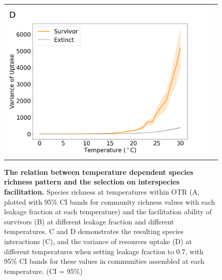 \begin{figure}
\begin{tabular}{c@{}c@{}}
    \includegraphics[scale=0.27]{./Figures/07_U.png}
    \end{tabular}
    \caption{\textbf{The relation between temperature dependent species richness pattern and the selection on interspecies facilitation.} Species richness at temperatures within OTR (A, plotted with 95\% CI bands for community richness values with each leakage fraction at each temperature) and the facilitation ability of survivors (B) at different leakage fraction and different temperatures. C and D demonstrates the resulting species interactions (C), and the variance of resources uptake (D) at different temperatures when setting leakage fraction to 0.7, with 95\% CI bands for these values in communities assembled at each temperature. (CI = 95\%)} 
    \label{fig:lf}
\end{figure}



